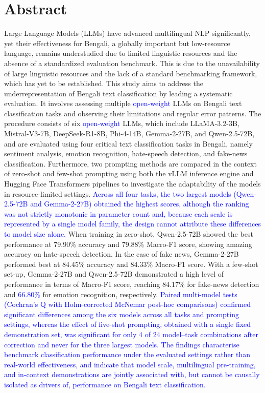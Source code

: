 \documentclass[10pt,letterpaper]{article}
\newcommand{\rev}[1]{\textcolor{blue}{#1}}
\begin{document}
\section*{Abstract}
Large Language Models (LLMs) have advanced multilingual NLP significantly, yet their effectiveness for Bengali, a globally important but low-resource language, remains understudied due to limited linguistic resources and the absence of a standardized evaluation benchmark. This is due to the unavailability of large linguistic resources and the lack of a standard benchmarking framework, which has yet to be established. This study aims to address the underrepresentation of Bengali text classification by leading a systematic evaluation. It involves assessing multiple \rev{open-weight} LLMs on Bengali text classification tasks and observing their limitations and regular error patterns. The procedure consists of six \rev{open-weight} LLMs, which include LLaMA-3.2-3B, Mistral-V3-7B, DeepSeek-R1-8B, Phi-4-14B, Gemma-2-27B, and Qwen-2.5-72B, and are evaluated using four critical text classification tasks in Bengali, namely sentiment analysis, emotion recognition, hate-speech detection, and fake-news classification. Furthermore, two prompting methods are compared in the context of zero-shot and few-shot prompting using both the vLLM inference engine and Hugging Face Transformers pipelines to investigate the adaptability of the models in resource-limited settings. \rev{Across all four tasks, the two largest models (Qwen-2.5-72B and Gemma-2-27B) obtained the highest scores, although the ranking was not strictly monotonic in parameter count and, because each scale is represented by a single model family, the design cannot attribute these differences to model size alone.} When training in zero-shot, Qwen-2.5-72B showed the best performance at 79.90\% accuracy and 79.88\% Macro-F1 score, showing amazing accuracy on hate-speech detection. In the case of fake news, Gemma-2-27B performed best at 84.45\% accuracy and 84.33\% Macro-F1 score. With a few-shot set-up, Gemma-2-27B and Qwen-2.5-72B demonstrated a high level of performance in terms of Macro-F1 score, reaching 84.17\% for fake-news detection and \rev{66.80\%} for emotion recognition, respectively. \rev{Paired multi-model tests (Cochran's Q with Holm-corrected McNemar post-hoc comparisons) confirmed significant differences among the six models across all tasks and prompting settings, whereas the effect of five-shot prompting, obtained with a single fixed demonstration set, was significant for only 4 of 24 model--task combinations after correction and never for the three largest models. The findings characterise benchmark classification performance under the evaluated settings rather than real-world effectiveness, and indicate that model scale, multilingual pre-training, and in-context demonstrations are jointly associated with, but cannot be causally isolated as drivers of, performance on Bengali text classification.}
\end{document}
